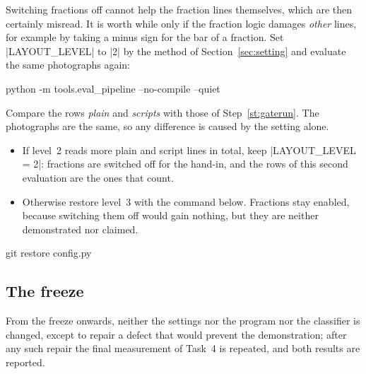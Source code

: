 Switching fractions off cannot help the fraction lines themselves, which are then certainly
misread. It is worth while only if the fraction logic damages \emph{other} lines, for example
by taking a minus sign for the bar of a fraction. Set \code|LAYOUT_LEVEL| to \code|2| by the
method of Section~\ref{sec:setting} and evaluate the same photographs again:
\begin{ps}
python -m tools.eval_pipeline --no-compile --quiet
\end{ps}
Compare the rows \emph{plain} and \emph{scripts} with those of Step~\ref{st:gaterun}. The
photographs are the same, so any difference is caused by the setting alone.
\begin{itemize}
\item If level~2 reads more plain and script lines in total, keep \code|LAYOUT_LEVEL = 2|:
  fractions are switched off for the hand-in, and the rows of this second evaluation are the
  ones that count.
\item Otherwise restore level~3 with the command below. Fractions stay enabled, because
  switching them off would gain nothing, but they are neither demonstrated nor claimed.
\end{itemize}
\begin{ps}
git restore config.py
\end{ps}


\subsection{The freeze}
\label{sec:freeze}

From the freeze onwards, neither the settings nor the program nor the classifier is changed,
except to repair a defect that would prevent the demonstration; after any such repair the final
measurement of Task~4 is repeated, and both results are reported.

